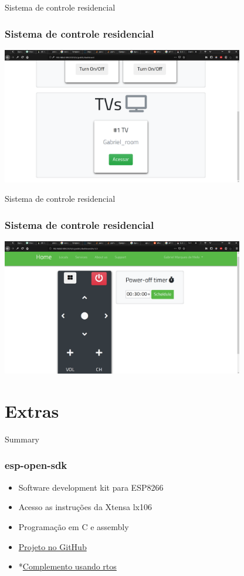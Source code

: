 \documentclass[10pt, compress]{beamer}
\begin{document}
\begin{frame}{Sistema de controle residencial}
  \frametitle{Sistema de controle residencial}
  \begin{center}
    \includegraphics[width=300pt]{images/iot-server_dash2.png}
  \end{center}
\end{frame}

\begin{frame}{Sistema de controle residencial}
  \frametitle{Sistema de controle residencial}
  \begin{center}
    \includegraphics[width=300pt]{images/iot-server_remotecontrol.png}
  \end{center}
\end{frame}
\section{Extras}

\begin{frame}{Summary}
  \frametitle{esp-open-sdk}
  \vspace{15pt}
  \begin{itemize}
    \item Software development kit para ESP8266
    \item Acesso as instruções da Xtensa lx106
    \item Programação em C e assembly
    \item \href{https://github.com/pfalcon/esp-open-sdk}{Projeto no GitHub}
    \item *\href{https://github.com/SuperHouse/esp-open-rtos}{Complemento usando rtos}
  \end{itemize}
\end{frame}
\end{document}
